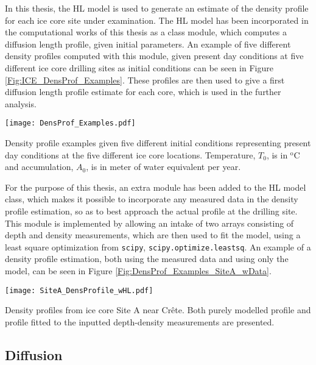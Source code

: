 \documentclass[../../CompleteThesis2/Complete_2ndDraft]{subfiles}
\begin{document}
In this thesis, the HL model is used to generate an estimate of the density profile for each ice core site under examination. The HL model has been incorporated in the computational works of this thesis as a class module, which computes a diffusion length profile, given initial parameters. An example of five different density profiles computed with this module, given present day conditions at five different ice core drilling sites as initial conditions can be seen in Figure \ref{Fig:ICE_DensProf_Examples}. These profiles are then used to give a first diffusion length profile estimate for each core, which is used in the further analysis. 
\begin{marginfigure}
	\centering
	\texttt{[image: DensProf\_Examples.pdf]}
	\caption[Five theoretical density profile examples]{\footnotesize Density profile examples given five different initial conditions representing present day conditions at the five different ice core locations. Temperature, $T_0$, is in $^{\text{o}}$C and accumulation, $A_0$, is in meter of water equivalent per year.}
	\label{Fig:ICE_DensProf_Examples}
\end{marginfigure}
For the purpose of this thesis, an extra module has been added to the HL model class, which makes it possible to incorporate any measured data in the density profile estimation, so as to best approach the actual profile at the drilling site. This module is implemented by allowing an intake of two arrays consisting of depth and density measurements, which are then used to fit the model, using a least square optimization from \lstinline[language=python]|scipy|, \lstinline[language=python]|scipy.optimize.leastsq|. An example of a density profile estimation, both using the measured data and using only the model, can be seen in Figure \ref{Fig:DensProf_Examples_SiteA_wData}.
\begin{marginfigure}
	\centering
	\texttt{[image: SiteA\_DensProfile\_wHL.pdf]}
	\caption[Site A density profile, data and theory]{\footnotesize Density profiles from ice core Site A near Crête. Both purely modelled profile and profile fitted to the inputted depth-density measurements are presented.}
	\label{Fig:DensProf_Examples_SiteA_wData}
\end{marginfigure}




\subsection[Diffusion]{Diffusion}
\label{Subsec:Ice_DiffusionAndDensification_Diffusion}
\end{document}
